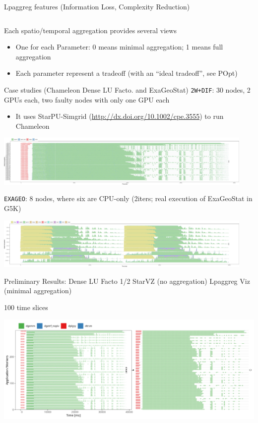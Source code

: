 \documentclass[12pt,xcolor=dvipsnames,presentation,aspectratio=169]{beamer}
\begin{document}
{\begin{frame}[label={sec:org5e20003},fragile]{Lpaggreg features (Information Loss, Complexity Reduction)}
\begin{columns}
\begin{column}{0.5\columnwidth}
\begin{center}
\end{center}
\end{column}
\end{columns}
Each spatio/temporal aggregation provides several views
\begin{itemize}
\item One for each \alert{Parameter}: 0 means minimal aggregation; 1 means full aggregation
\item Each parameter represent a tradeoff (with an ``ideal tradeoff'', see \alert{POpt})
\end{itemize}
\end{frame}
\begin{frame}[label={sec:org13d4819},fragile]{Case studies (Chameleon Dense LU Facto. and ExaGeoStat)}
 \texttt{2W+DIF}: 30 nodes, 2 GPUs each, two faulty nodes with only one GPU each
\begin{itemize}
\item It uses StarPU-Simgrid (\url{http://dx.doi.org/10.1002/cpe.3555}) to run Chameleon
\end{itemize}
\begin{center}
\includegraphics[height=2.5cm]{./2w+dif_original.pdf}
\end{center}

\texttt{EXAGEO}: 8 nodes, where six are CPU-only (2iters; real execution of ExaGeoStat in G5K)
\begin{center}
\includegraphics[height=2.5cm]{./exageo_original.pdf}
\end{center}
\end{frame}
\begin{frame}[label={sec:org2205751}]{Preliminary Results: Dense LU Facto 1/2}
StarVZ (no aggregation)  \hfill  Lpaggreg Viz (minimal aggregation)

 \hfill 100 time slices

\begin{center}
\includegraphics[width=.87\linewidth]{./2w+dif_p-0.png}
\end{center}


\end{frame}}
\end{document}
